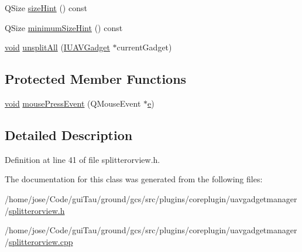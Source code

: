 \begin{DoxyCompactItemize}
\item 
Q\-Size \hyperlink{group___core_plugin_gabe56a9cd1822e47d15cf0e896917e129}{size\-Hint} () const 
\item 
Q\-Size \hyperlink{group___core_plugin_ga653d5db7b113739e805ae097aaa63b25}{minimum\-Size\-Hint} () const 
\item 
\hyperlink{group___u_a_v_objects_plugin_ga444cf2ff3f0ecbe028adce838d373f5c}{void} \hyperlink{group___core_plugin_gabd07fabb713be54a103c57a8842eacee}{unsplit\-All} (\hyperlink{class_core_1_1_i_u_a_v_gadget}{I\-U\-A\-V\-Gadget} $\ast$current\-Gadget)
\end{DoxyCompactItemize}
\subsection*{Protected Member Functions}
\begin{DoxyCompactItemize}
\item 
\hyperlink{group___u_a_v_objects_plugin_ga444cf2ff3f0ecbe028adce838d373f5c}{void} \hyperlink{group___core_plugin_ga73faf601d8ba03838e2e6c0c82554719}{mouse\-Press\-Event} (Q\-Mouse\-Event $\ast$\hyperlink{_o_p_plots_8m_a9425be9aab51621e317ba7ade564b570}{e})
\end{DoxyCompactItemize}


\subsection{Detailed Description}


Definition at line 41 of file splitterorview.\-h.



The documentation for this class was generated from the following files\-:\begin{DoxyCompactItemize}
\item 
/home/jose/\-Code/gui\-Tau/ground/gcs/src/plugins/coreplugin/uavgadgetmanager/\hyperlink{splitterorview_8h}{splitterorview.\-h}\item 
/home/jose/\-Code/gui\-Tau/ground/gcs/src/plugins/coreplugin/uavgadgetmanager/\hyperlink{splitterorview_8cpp}{splitterorview.\-cpp}\end{DoxyCompactItemize}
